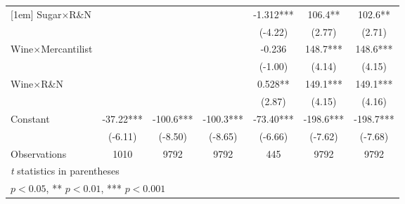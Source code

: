 {\begin{tabular}{l*{6}{c}}
[1em]
Sugar$\times$R\&N&                     &                     &                     &      -1.312***&       106.4** &       102.6** \\
                    &                     &                     &                     &     (-4.22)         &      (2.77)         &      (2.71)         \\
[1em]
Wine$\times$Mercantilist&                     &                     &                     &      -0.236         &       148.7***&       148.6***\\
                    &                     &                     &                     &     (-1.00)         &      (4.14)         &      (4.15)         \\
[1em]
Wine$\times$R\&N&                     &                     &                     &       0.528** &       149.1***&       149.1***\\
                    &                     &                     &                     &      (2.87)         &      (4.15)         &      (4.16)         \\
[1em]
Constant            &      -37.22***&      -100.6***&      -100.3***&      -73.40***&      -198.6***&      -198.7***\\
                    &     (-6.11)         &     (-8.50)         &     (-8.65)         &     (-6.66)         &     (-7.62)         &     (-7.68)         \\
\hline
Observations        &        1010         &        9792         &        9792         &         445         &        9792         &        9792         \\
\hline\hline
\multicolumn{7}{l}{\footnotesize \textit{t} statistics in parentheses}\\
\multicolumn{7}{l}{\footnotesize * \(p<0.05\), ** \(p<0.01\), *** \(p<0.001\)}\\
\end{tabular}
}
